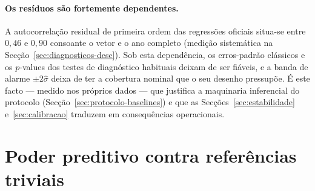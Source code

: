 \paragraph{Os resíduos são fortemente dependentes.} A autocorrelação residual
de primeira ordem das regressões oficiais situa-se entre $0{,}46$ e $0{,}90$
consoante o vetor e o ano completo (medição sistemática na
Secção~\ref{sec:diagnosticos-desc}). Sob esta dependência, os erros-padrão clássicos e
os $p$-values dos testes de diagnóstico habituais deixam de ser fiáveis, e a
banda de alarme $\pm 2\hat\sigma$ deixa de ter a cobertura nominal que o seu
desenho pressupõe. É este facto --- medido nos próprios dados --- que
justifica a maquinaria inferencial do protocolo
(Secção~\ref{sec:protocolo-baselines}) e que as Secções~\ref{sec:estabilidade}
e~\ref{sec:calibracao} traduzem em consequências operacionais.

\section{Poder preditivo contra referências triviais}
\label{sec:poder-preditivo}


